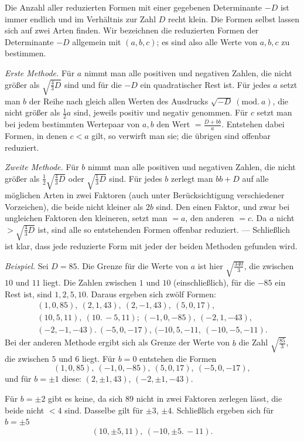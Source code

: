 Die Anzahl aller reduzierten Formen mit einer gegebenen Determinante $-D$ ist immer endlich und im Verhältnis zur Zahl $D$ recht klein. Die Formen selbst lassen sich auf zwei Arten finden. Wir bezeichnen die reduzierten Formen der Determinante $-D$ allgemein mit $(a,b,c)$; es sind also alle Werte von $a,b,c$ zu bestimmen.

\emph{Erste Methode.} Für $a$ nimmt man alle positiven und negativen Zahlen, die nicht größer als $\surd{\frac43 D}$ sind und für die $-D$ ein quadratischer Rest ist. Für jedes $a$ setzt man $b$ der Reihe nach gleich allen Werten des Ausdrucks $\surd{-D}\ (\mathrm{mod.}\ a)$, die nicht größer als $\frac12 a$ sind, jeweils positiv und negativ genommen. Für $c$ setzt man bei jedem bestimmten Wertepaar von $a,b$ den Wert $=\frac{D+bb}{a}$. Entstehen dabei Formen, in denen $c<a$ gilt, so verwirft man sie; die übrigen sind offenbar reduziert.

\emph{Zweite Methode.} Für $b$ nimmt man alle positiven und negativen Zahlen, die nicht größer als $\frac12\surd{\frac43 D}$ oder $\surd{\frac13 D}$ sind. Für jedes $b$ zerlegt man $bb+D$ auf alle möglichen Arten in zwei Faktoren (auch unter Berücksichtigung verschiedener Vorzeichen), die beide nicht kleiner als $2b$ sind. Den einen Faktor, und zwar bei ungleichen Faktoren den kleineren, setzt man $=a$, den anderen $=c$. Da $a$ nicht $>\surd{\frac43 D}$ ist, sind alle so entstehenden Formen offenbar reduziert. --- Schließlich ist klar, dass jede reduzierte Form mit jeder der beiden Methoden gefunden wird.

\emph{Beispiel.} Sei $D=85$. Die Grenze für die Werte von $a$ ist hier $\surd{\frac{340}{3}}$, die zwischen $10$ und $11$ liegt. Die Zahlen zwischen $1$ und $10$ (einschließlich), für die $-85$ ein Rest ist, sind $1,2,5,10$. Daraus ergeben sich zwölf Formen:
\[
\begin{gathered}
(1,0,85),\ (2,1,43),\ (2,-1,43),\ (5,0,17),\\
(10,5,11),\ (10.\,-5,11);\ (-1,0,-85),\ (-2,1,-43),\\
(-2,-1,-43).\ (-5,0,-17),\ (-10,5,-11,\ (-10,-5,-11).
\end{gathered}
\]
Bei der anderen Methode ergibt sich als Grenze der Werte von $b$ die Zahl $\surd{\frac{85}{3}}$, die zwischen $5$ und $6$ liegt. Für $b=0$ entstehen die Formen
\[
(1,0,85),\ (-1,0,-85),\ (5,0,17),\ (-5,0,-17),
\]
und für $b=\pm1$ diese: $(2,\pm1,43)$, $(-2,\pm1,-43)$.

Für $b=\pm2$ gibt es keine, da sich $89$ nicht in zwei Faktoren zerlegen lässt, die beide nicht $<4$ sind. Dasselbe gilt für $\pm3$, $\pm4$. Schließlich ergeben sich für $b=\pm5$
\[
(10,\pm5,11),\ (-10,\pm5.\,-11).
\]

